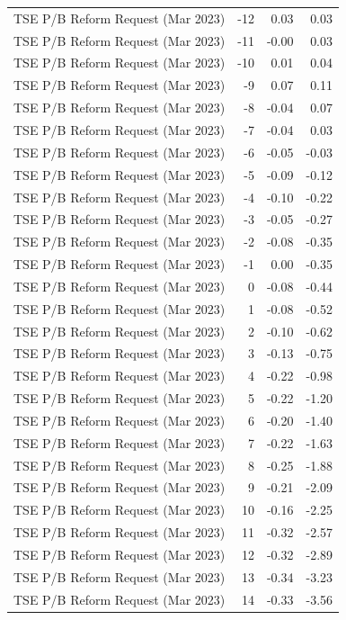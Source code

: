 \begin{table}
\begin{tabular}{lrrr}
TSE P/B Reform Request (Mar 2023) & -12 & 0.03 & 0.03 \\
TSE P/B Reform Request (Mar 2023) & -11 & -0.00 & 0.03 \\
TSE P/B Reform Request (Mar 2023) & -10 & 0.01 & 0.04 \\
TSE P/B Reform Request (Mar 2023) & -9 & 0.07 & 0.11 \\
TSE P/B Reform Request (Mar 2023) & -8 & -0.04 & 0.07 \\
TSE P/B Reform Request (Mar 2023) & -7 & -0.04 & 0.03 \\
TSE P/B Reform Request (Mar 2023) & -6 & -0.05 & -0.03 \\
TSE P/B Reform Request (Mar 2023) & -5 & -0.09 & -0.12 \\
TSE P/B Reform Request (Mar 2023) & -4 & -0.10 & -0.22 \\
TSE P/B Reform Request (Mar 2023) & -3 & -0.05 & -0.27 \\
TSE P/B Reform Request (Mar 2023) & -2 & -0.08 & -0.35 \\
TSE P/B Reform Request (Mar 2023) & -1 & 0.00 & -0.35 \\
TSE P/B Reform Request (Mar 2023) & 0 & -0.08 & -0.44 \\
TSE P/B Reform Request (Mar 2023) & 1 & -0.08 & -0.52 \\
TSE P/B Reform Request (Mar 2023) & 2 & -0.10 & -0.62 \\
TSE P/B Reform Request (Mar 2023) & 3 & -0.13 & -0.75 \\
TSE P/B Reform Request (Mar 2023) & 4 & -0.22 & -0.98 \\
TSE P/B Reform Request (Mar 2023) & 5 & -0.22 & -1.20 \\
TSE P/B Reform Request (Mar 2023) & 6 & -0.20 & -1.40 \\
TSE P/B Reform Request (Mar 2023) & 7 & -0.22 & -1.63 \\
TSE P/B Reform Request (Mar 2023) & 8 & -0.25 & -1.88 \\
TSE P/B Reform Request (Mar 2023) & 9 & -0.21 & -2.09 \\
TSE P/B Reform Request (Mar 2023) & 10 & -0.16 & -2.25 \\
TSE P/B Reform Request (Mar 2023) & 11 & -0.32 & -2.57 \\
TSE P/B Reform Request (Mar 2023) & 12 & -0.32 & -2.89 \\
TSE P/B Reform Request (Mar 2023) & 13 & -0.34 & -3.23 \\
TSE P/B Reform Request (Mar 2023) & 14 & -0.33 & -3.56 \\

\end{tabular}
\end{table}
